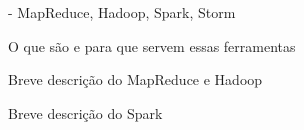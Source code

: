 





- MapReduce, Hadoop, Spark, Storm


O que são e para que servem essas ferramentas 

Breve descrição do MapReduce e Hadoop

Breve descrição do Spark


